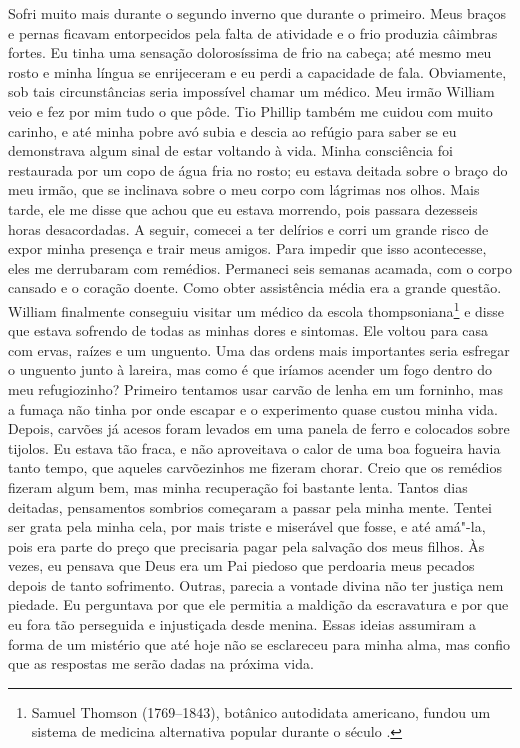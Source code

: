 Sofri muito mais durante o segundo
inverno que durante o primeiro. Meus braços e pernas ficavam
entorpecidos pela falta de atividade e o frio produzia câimbras fortes.
Eu tinha uma sensação dolorosíssima de frio na cabeça; até mesmo meu
rosto e minha língua se enrijeceram e eu perdi a capacidade de fala.
Obviamente, sob tais circunstâncias seria impossível chamar um médico.
Meu irmão William veio e fez por mim tudo o que pôde. Tio Phillip também
me cuidou com muito carinho, e até minha pobre avó subia e descia ao
refúgio para saber se eu demonstrava algum sinal de estar voltando à
vida. Minha consciência foi restaurada por um copo de água fria no
rosto; eu estava deitada sobre o braço do meu irmão, que se inclinava
sobre o meu corpo com lágrimas nos olhos. Mais tarde, ele me disse que
achou que eu estava morrendo, pois passara dezesseis horas desacordadas.
A seguir, comecei a ter delírios e corri um grande risco de expor minha
presença e trair meus amigos. Para impedir que isso acontecesse, eles me
derrubaram com remédios. Permaneci seis semanas acamada, com o corpo
cansado e o coração doente. Como obter assistência média era a grande
questão. William finalmente conseguiu visitar um médico da escola
thompsoniana\footnote{Samuel Thomson (1769--1843), botânico autodidata
  americano, fundou um sistema de medicina alternativa popular durante o
  século .} e disse que estava sofrendo de todas as minhas dores e
sintomas. Ele voltou para casa com ervas, raízes e um unguento. Uma das
ordens mais importantes seria esfregar o unguento junto à lareira, mas
como é que iríamos acender um fogo dentro do meu refugiozinho? Primeiro
tentamos usar carvão de lenha em um forninho, mas a fumaça não tinha por
onde escapar e o experimento quase custou minha vida. Depois, carvões já
acesos foram levados em uma panela de ferro e colocados sobre tijolos.
Eu estava tão fraca, e não aproveitava o calor de uma boa fogueira havia
tanto tempo, que aqueles carvõezinhos me fizeram chorar. Creio que os
remédios fizeram algum bem, mas minha recuperação foi bastante lenta.
Tantos dias deitadas, pensamentos sombrios começaram a passar pela minha
mente. Tentei ser grata pela minha cela, por mais triste e miserável que
fosse, e até amá"-la, pois era parte do preço que precisaria pagar pela
salvação dos meus filhos. Às vezes, eu pensava que Deus era um Pai
piedoso que perdoaria meus pecados depois de tanto sofrimento. Outras,
parecia a vontade divina não ter justiça nem piedade. Eu perguntava por
que ele permitia a maldição da escravatura e por que eu fora tão
perseguida e injustiçada desde menina. Essas ideias assumiram a forma de
um mistério que até hoje não se esclareceu para minha alma, mas confio
que as respostas me serão dadas na próxima vida.

